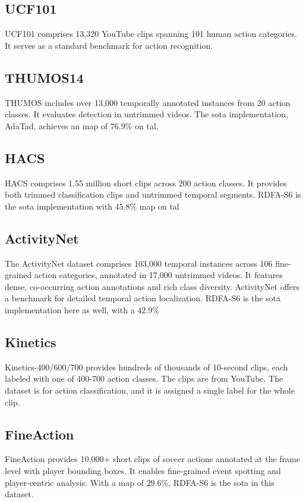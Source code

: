\subsection{UCF101}
UCF101 \cite{dataset:UCF101} comprises 13,320 YouTube clips spanning 101 human action categories. It serves as a standard benchmark for action recognition. 

\subsection{THUMOS14}
THUMOS \cite{dataset:thumos} includes over 13,000 temporally annotated instances from 20 action classes. It evaluates detection in untrimmed videos. The \acrfull{sota} implementation, AdaTad, achieves an \acrfull{map} of $76.9\%$ on \acrfull{tal}.

\subsection{HACS}
HACS \cite{dataset:hacs} comprises 1.55 million short clips across 200 action classes. It provides both trimmed classification clips and untrimmed temporal segments. RDFA-S6 is the \acrshort{sota} implementation with $45.8\%$ \acrshort{map} on \acrshort{tal}

\subsection{ActivityNet}
The ActivityNet dataset \cite{dataset:activitynet} comprises 103,000 temporal instances across 106 fine-grained action categories, annotated in 17,000 untrimmed videos. It features dense, co-occurring action annotations and rich class diversity. ActivityNet offers a benchmark for detailed temporal action localization. RDFA-S6 is the \acrshort{sota} implementation here as well, with a $42.9\%$

\subsection{Kinetics}
Kinetics-400/600/700 \cite{dataset:kinetics} provides hundreds of thousands of 10-second clips, each labeled with one of 400-700 action classes. The clips are from YouTube. The dataset is for action classification, and it is assigned a single label for the whole clip. 

\subsection{FineAction}
FineAction \cite{dataset:fineaction} provides 10,000+ short clips of soccer actions annotated at the frame level with player bounding boxes. It enables fine-grained event spotting and player-centric analysis. With a \acrshort{map} of $29.6\%$, RDFA-S6 is the \acrshort{sota} in this dataset.

